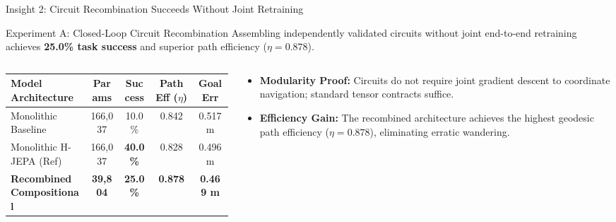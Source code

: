 \documentclass[aspectratio=169, 10pt]{beamer}
\begin{document}
\begin{frame}{Insight 2: Circuit Recombination Succeeds Without Joint Retraining}
  \begin{block}{Experiment A: Closed-Loop Circuit Recombination}
    Assembling independently validated circuits without joint end-to-end retraining achieves \textbf{25.0\% task success} and superior path efficiency ($\eta = 0.878$).
  \end{block}
  \vspace{-0.2cm}
  \begin{columns}[T]
    \begin{column}{0.52\textwidth}
      \setlength{\tabcolsep}{2pt}
      \begin{table}
        \centering
        \scriptsize
        \begin{tabular}{lcccc}
          \toprule
          \textbf{Model Architecture} & \textbf{Params} & \textbf{Success} & \textbf{Path Eff ($\eta$)} & \textbf{Goal Err} \\
          \midrule
          Monolithic Baseline & 166,037 & 10.0\% & 0.842 & 0.517 m \\
          Monolithic H-JEPA (Ref) & 166,037 & \textbf{40.0\%} & 0.828 & 0.496 m \\
          \textbf{Recombined Compositional} & \textbf{39,804} & \textbf{25.0\%} & \textbf{0.878} & \textbf{0.469 m} \\
          \bottomrule
        \end{tabular}
      \end{table}
    \end{column}
    \begin{column}{0.44\textwidth}
      \begin{itemize}
        \item \textbf{Modularity Proof:} Circuits do not require joint gradient descent to coordinate navigation; standard tensor contracts suffice.
        \item \textbf{Efficiency Gain:} The recombined architecture achieves the highest geodesic path efficiency ($\eta = 0.878$), eliminating erratic wandering.
      \end{itemize}
    \end{column}
  \end{columns}
\end{frame}
\end{document}
